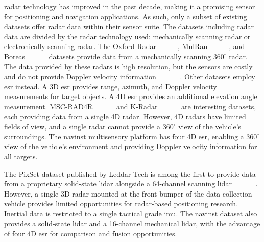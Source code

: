 \ac{radar} technology has improved in the past decade, making it a promising sensor for positioning and navigation applications. As such, only a subset of existing datasets offer \ac{radar} data within their sensor suite. The datasets including \ac{radar} data are divided by the \ac{radar} technology used: mechanically scanning \ac{radar} or electronically scanning \ac{radar}. The Oxford Radar____, MulRan____, and Boreas____ datasets provide data from a mechanically scanning $360^\circ$ \ac{radar}. The data provided by these \acp{radar} is high resolution, but the sensors are costly and do not provide Doppler velocity information ____. Other datasets employ \ac{esr} instead. A 3D \ac{esr} provides range, azimuth, and Doppler velocity measurements for target objects. A 4D \ac{esr} provides an additional elevation angle measurement. MSC-RAD4R____ and K-Radar____ are interesting datasets, each providing data from a single 4D \ac{radar}. However, 4D \acp{radar} have limited fields of view, and a single \ac{radar} cannot provide a $360^\circ$ view of the vehicle's surroundings. The \ac{navinst} multisensory platform has four 4D \ac{esr}, enabling a $360^\circ$ view of the vehicle's environment and providing Doppler velocity information for all targets.  

The PixSet dataset published by Leddar Tech is among the first to provide data from a proprietary solid-state \ac{lidar} alongside a 64-channel scanning \ac{lidar} ____. However, a single 3D \ac{radar} mounted at the front bumper of the data collection vehicle provides limited opportunities for \ac{radar}-based positioning research. Inertial data is restricted to a single tactical grade \ac{imu}. The \ac{navinst} dataset also provides a solid-state \ac{lidar} and a 16-channel mechanical \ac{lidar}, with the advantage of four 4D \ac{esr} for comparison and fusion opportunities.